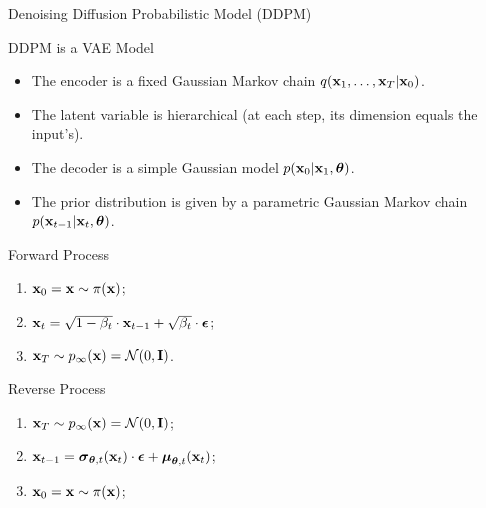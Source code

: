 \documentclass{beamer}
\begin{document}
\begin{frame}{Denoising Diffusion Probabilistic Model (DDPM)}
    \begin{block}{DDPM is a VAE Model}
        \begin{itemize}
            \item The encoder is a fixed Gaussian Markov chain $q(\mathbf{x}_1, \dots, \mathbf{x}_T | \mathbf{x}_0)$.
            \item The latent variable is hierarchical (at each step, its dimension equals the input's).
            \item The decoder is a simple Gaussian model $p(\mathbf{x}_0 | \mathbf{x}_1, \boldsymbol{\theta})$.
            \item The prior distribution is given by a parametric Gaussian Markov chain $p(\mathbf{x}_{t-1} | \mathbf{x}_t, \boldsymbol{\theta})$.
        \end{itemize}
    \end{block}
    \eqpause
    \begin{minipage}{0.5\linewidth}
        \begin{block}{Forward Process}
            \begin{enumerate}
                \item $\mathbf{x}_0 = \mathbf{x} \sim \pi(\mathbf{x})$;
                \item $\mathbf{x}_t = \sqrt{1 - \beta_t} \cdot \mathbf{x}_{t - 1} + \sqrt{\beta_t} \cdot \boldsymbol{\epsilon}$;
                \item $\mathbf{x}_T \sim p_{\infty}(\mathbf{x}) = \mathcal{N}(0, \mathbf{I})$.
            \end{enumerate}
        \end{block}
    \end{minipage}%
    \eqpause
    \begin{minipage}{0.55\linewidth}
        \begin{block}{Reverse Process}
            \begin{enumerate}
                \item $\mathbf{x}_T \sim p_{\infty}(\mathbf{x}) = \mathcal{N}(0, \mathbf{I})$;
                \item $\mathbf{x}_{t - 1} = \boldsymbol{\sigma}_{\boldsymbol{\theta}, t}(\mathbf{x}_t) \cdot \boldsymbol{\epsilon} + \boldsymbol{\mu}_{\boldsymbol{\theta}, t}(\mathbf{x}_t)$;
                \item $\mathbf{x}_0 = \mathbf{x} \sim \pi(\mathbf{x})$;
            \end{enumerate}
        \end{block}
    \end{minipage}
\end{frame}
\end{document}
